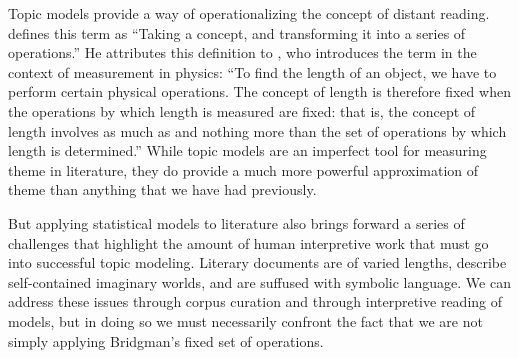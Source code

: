 Topic models provide a way of operationalizing the concept of distant reading.
\cite{moretti2013operationalizing} defines this term as ``Taking a concept, and transforming it into a series of operations.''
He attributes this definition to \cite{bridgman1927logic},  who introduces the term in the context of measurement in physics: ``To find the length of an object, we have to perform certain physical operations. The concept of length is therefore fixed when the operations by which length is measured are fixed: that is, the concept of length involves as much as and nothing more than the set of operations by which length is determined.''
While topic models are an imperfect tool for measuring theme in literature, they do provide a much more powerful approximation of theme than anything that we have had previously.

But applying statistical models to literature also brings forward a series of challenges that highlight the amount of human interpretive work that must go into successful topic modeling.
Literary documents are of varied lengths, describe self-contained imaginary worlds, and are suffused with symbolic language.
We can address these issues through corpus curation and through interpretive reading of models, but in doing so we must necessarily confront the fact that we are not simply applying Bridgman's fixed set of operations.




























